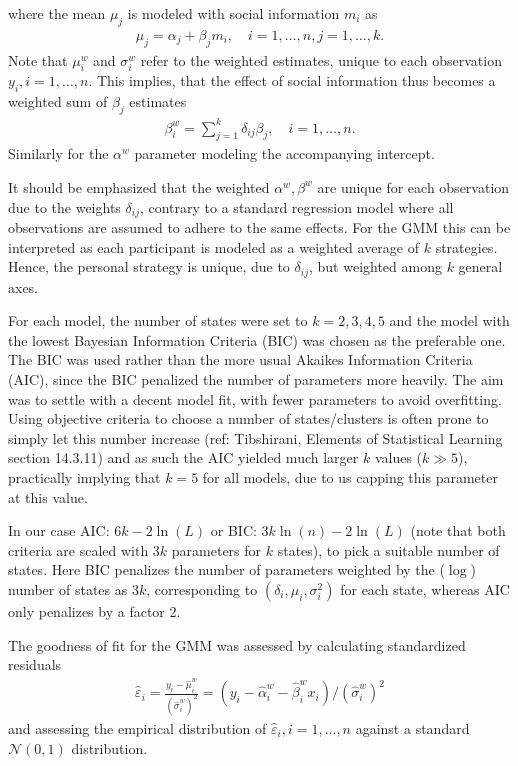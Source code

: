 \documentclass[9pt,a4paper,twocolumn,lineno]{article}
\begin{document}
where the mean $\mu_j$ is modeled with social information $m_i$ as
\begin{align}
	\mu_j = \alpha_j+\beta_j m_i, \quad i=1,\dots,n, j=1,\dots,k.
\end{align}
Note that $\mu^w_i$ and $\sigma^w_i$ refer to the weighted estimates, unique to each observation $y_i, i=1, \dots, n$. This implies, that the effect of social information thus becomes a weighted sum of $\beta_j$ estimates
\begin{align}
	\beta^w_i = \sum_{j=1}^k \delta_{ij} \beta_{j}, \quad i=1,\dots, n. \label{eq: weighted beta}
\end{align}
Similarly for the $\alpha^w$ parameter modeling the accompanying intercept.

It should be emphasized that the weighted $\alpha^w,\beta^w$ are unique for each observation due to the weights $\delta_{ij}$, contrary to a standard regression model where all observations are assumed to adhere to the same effects. For the GMM this can be interpreted as each participant is modeled as a weighted average of $k$ strategies. Hence, the personal strategy is unique, due to $\delta_{ij}$, but weighted among $k$ general axes. 

For each model, the number of states were set to $k=2,3,4,5$ and the model with the lowest Bayesian Information Criteria (BIC) was chosen as the preferable one. The BIC was used rather than the more usual Akaikes Information Criteria (AIC), since the BIC penalized the number of parameters more heavily. The aim was to settle with a decent model fit, with fewer parameters to avoid overfitting. Using objective criteria to choose a number of states/clusters is often prone to simply let this number increase (ref: Tibshirani, Elements of Statistical Learning section 14.3.11) and as such the AIC yielded much larger $k$ values ($k \gg 5$), practically implying that $k=5$ for all models, due to us capping this parameter at this value. 

In our case AIC: $6k-2\ln(L)$ or BIC: $3k\ln(n)-2\ln(L)$ (note that both criteria are scaled with $3k$ parameters for $k$ states), to pick a suitable number of states. Here BIC penalizes the number of parameters weighted by the ($\log$) number of states as $3k$, corresponding to $(\delta_i,\mu_i,\sigma^2_i)$ for each state, whereas AIC only penalizes by a factor 2.

The goodness of fit for the GMM was assessed by calculating standardized residuals
\begin{align}
 	\hat{\varepsilon}_i = \frac{y_i - \hat{\mu}^w_i}{(\hat{\sigma}^w_i)^2} = (y_i - \hat{\alpha}^w_i-\hat{\beta}^w_ix_i)/(\hat{\sigma}^w_i)^2 \label{eq: GMM residuals}
\end{align}
and assessing the empirical distribution of $\hat{\varepsilon}_i, i=1,\dots,n$ against a standard $\mathcal{N}(0,1)$ distribution.
\end{document}

